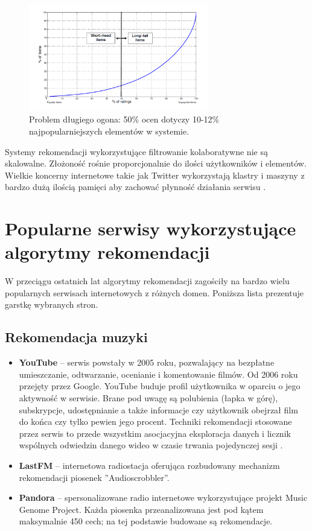 \documentclass[twoside]{iisthesis}
\begin{document}
  \begin{figure}[!ht] 
 	  	\centering
 	  	\includegraphics[width=0.7\textwidth]{longtail}
 	  	\caption{Problem długiego ogona: 50\% ocen dotyczy 10-12\% najpopularniejszych elementów w systemie\protect\cite{id:RubensRecSysHB2010}.}
 	  	\label{fig:longtail}
  \end{figure}
	 
	 Systemy rekomendacji wykorzystujące filtrowanie kolaboratywne nie są skalowalne. Złożoność rośnie proporcjonalnie do ilości użytkowników i elementów. Wielkie koncerny internetowe takie jak Twitter wykorzystają klastry i maszyny z bardzo dużą ilością pamięci aby zachować płynność działania serwisu \cite{id:gupta2013wtf}.
	 
	 \section{Popularne serwisy wykorzystujące algorytmy rekomendacji}
	 
		W przeciągu ostatnich lat algorytmy rekomendacji zagościły na bardzo wielu popularnych serwisach internetowych z różnych domen. Poniższa lista prezentuje garstkę wybranych stron. 
	 
		 \subsection{Rekomendacja muzyki}
	 
		 \begin{itemize}
		 	\item \textbf{YouTube} -- serwis powstały w 2005 roku, pozwalający na bezpłatne umieszczanie, odtwarzanie, ocenianie i komentowanie filmów. Od 2006 roku przejęty przez Google. YouTube buduje profil użytkownika w oparciu o jego aktywność w serwisie. Brane pod uwagę są polubienia (łapka w górę), subskrypcje, udostępnianie a także informacje czy użytkownik obejrzał film do końca czy tylko pewien jego procent. Techniki rekomendacji stosowane przez serwis to przede wszystkim asocjacyjna eksploracja danych i licznik wspólnych odwiedzin danego wideo w czasie trwania pojedynczej sesji \cite{id:TheYouTubeVideoRecommendationSystem}. 
		 	\item \textbf{LastFM } -- internetowa radiostacja oferująca rozbudowany mechanizm rekomendacji piosenek ''Audioscrobbler''.   
		 	\item \textbf{Pandora}	-- spersonalizowane radio internetowe wykorzystujące projekt Music Genome Project. Każda piosenka przeanalizowana jest pod kątem maksymalnie 450 cech; na tej podstawie budowane są rekomendacje\cite{id:mgp}.
	
		 \end{itemize}
	 
\end{document}
